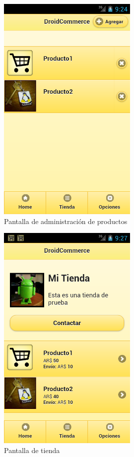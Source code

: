 \begin{figure}
  \centering
    \includegraphics[width=0.6\textwidth]{imagenes/capturas/administracion-productos.png}
        \caption{Pantalla de administración de productos}
    \label{fig:administrar-productos}
\end{figure}
\begin{figure}
  \centering
    \includegraphics[width=0.6\textwidth]{imagenes/capturas/vista-tienda.png}
        \caption{Pantalla de tienda}
    \label{fig:tienda}
\end{figure}

